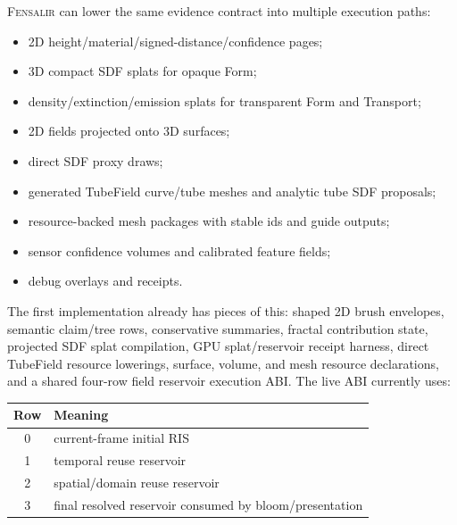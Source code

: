\documentclass[11pt]{article}
\newcommand{\Fensalir}{\textsc{Fensalir}}
\begin{document}
\Fensalir{} can lower the same evidence contract into multiple execution paths:

\begin{itemize}[leftmargin=1.5em]
  \item 2D height/material/signed-distance/confidence pages;
  \item 3D compact SDF splats for opaque Form;
  \item density/extinction/emission splats for transparent Form and Transport;
  \item 2D fields projected onto 3D surfaces;
  \item direct SDF proxy draws;
  \item generated TubeField curve/tube meshes and analytic tube SDF proposals;
  \item resource-backed mesh packages with stable ids and guide outputs;
  \item sensor confidence volumes and calibrated feature fields;
  \item debug overlays and receipts.
\end{itemize}

The first implementation already has pieces of this: shaped 2D brush envelopes,
semantic claim/tree rows, conservative summaries, fractal contribution state,
projected SDF splat compilation, GPU splat/reservoir receipt harness, direct
TubeField resource lowerings, surface, volume, and mesh resource declarations,
and a shared four-row field reservoir execution ABI.  The live ABI currently
uses:

\begin{center}
\begin{tabular}{cl}
\toprule
Row & Meaning \\
\midrule
0 & current-frame initial RIS \\
1 & temporal reuse reservoir \\
2 & spatial/domain reuse reservoir \\
3 & final resolved reservoir consumed by bloom/presentation \\
\bottomrule
\end{tabular}
\end{center}
\end{document}

